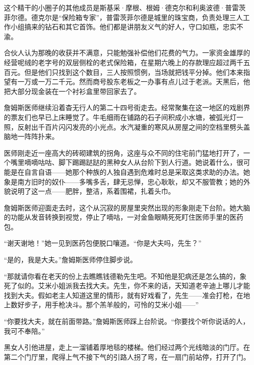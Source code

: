 \documentclass{article}
\begin{document}
这个精干的小圈子的其他成员是斯基采·摩根、根姆·德克尔和利奥波德·普雷茨菲尔德。德克尔是“保险箱专家”，普雷茨菲尔德是城里的珠宝商，负责处理三人工作小组搞来的钻石和其它首饰。他们都是讲朋友义气的好人，守口如瓶，忠实不渝。



合伙人认为那晚的收获并不满意，只能勉强补偿他们花费的气力。一家资金雄厚的经营呢绒的老字号的双层侧栓的老式保险箱，在星期六晚上的存款理应超过两千五百元。但是他们只找到这个数目，三人按照惯例，当场就把钱平分掉。他们本来指望有一万或一万二千元。然而商号股东老板之一办事有点儿过于老派。天黑后，他把大部分现金装在一个衬衫盒里带回家去了。



詹姆斯医师继续沿着杳无行人的第二十四号街走去。经常聚集在这一地区的戏剧界的票友们也早已上床睡觉了。牛毛细雨在铺路的石子间积成小水塘，被弧光灯一照，反射出千百片闪闪发亮的小光点。水汽凝重的寒风从房屋之间的空档里劈头盖脑地一阵阵扑来。



医师刚走近一座高大的砖砌建筑的拐角，这座与众不同的住宅前门猛地打开了，一个嘴里嘀嘀咕咕、脚下踢踢跶跶的黑种女人从台阶下到人行道。她说着什么，很可能是在自言自语——她那个种族的人独自遇到危难时总是采取这类求助的办法。她象是南方旧时的奴仆——多嘴多舌，肆无忌惮，忠心耿耿，却又不服管教；她的外貌说明了这一点——肥胖，整洁，系着围裙，扎着头巾。



詹姆斯医师迎面走去时，这个从沉寂的房屋里突然出现的形象刚走下台阶。她大脑的功能从发音转换到视觉，停止了嘀咕，一对金鱼眼睛死死盯住医师手里的医药包。



“谢天谢地！”她一见到医药包便脱口嚷道。“你是大夫吗，先生？”



“是的，我是大夫。”詹姆斯医师停住脚步说。



“那就请你看在老天的份上去瞧瞧钱德勒先生吧。不知他是犯病还是怎么搞的，象死了似的。艾米小姐派我去找大夫。先生，你不来的话，天知道老辛迪上哪儿才能找到大夫。假如老主人知道这里的情形，就有好戏看了，先生——准会打枪，在地上数好步子，用手枪决斗。那个羔羊般的，可怜的艾米小姐——”



“你要找大夫，就在前面带路。”詹姆斯医师踩上台阶说。“你要找个听你说话的人，我可不奉陪。”



黑女人引他进屋，走上一溜铺着厚地毯的楼梯。他们经过两个光线暗淡的门厅。在第二个门厅里，爬得上气不接下气的引路人拐了弯，在一扇门前站停，打开了门。
\end{document}
